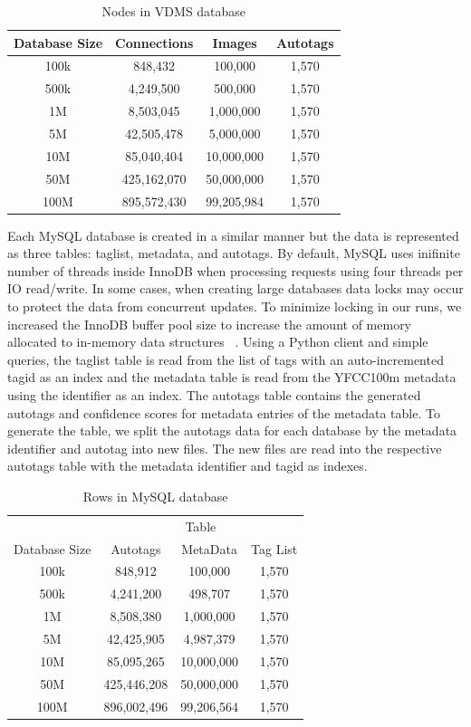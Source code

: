 \begin{table}[h]
\caption{Nodes in VDMS database}
\centering
\begin{tabular}{c c c c}
\hline\hline
Database Size & Connections & Images & Autotags\\
\hline
100k & 848,432      & 100,000     & 1,570\\
500k & 4,249,500    & 500,000     & 1,570\\
1M   & 8,503,045    & 1,000,000   & 1,570\\
5M   & 42,505,478   & 5,000,000   & 1,570\\
10M  & 85,040,404   & 10,000,000  & 1,570\\
50M  & 425,162,070  & 50,000,000  & 1,570\\
100M & 895,572,430  & 99,205,984  & 1,570\\
\hline
\end{tabular}
\label{table:vdmsnodes}
\end{table}

Each MySQL database is created in a similar manner but the data is represented as three tables: taglist, metadata, and autotags.  By default, MySQL uses inifinite number of threads inside InnoDB when processing requests using four threads per IO read/write.  In some cases, when creating large databases data locks may occur to protect the data from concurrent updates.  To minimize locking in our runs, we increased the InnoDB buffer pool size to increase the amount of memory allocated to in-memory data structures ~\cite{mysql,mysql_blog}. Using a Python client and simple queries, the taglist table is read from the list of tags with an auto-incremented tagid as an index and the metadata table is read from the YFCC100m metadata using the identifier as an index. The autotags table contains the generated autotags and confidence scores for metadata entries of the metadata table. To generate the table, we split the autotags data for each database by the metadata identifier and autotag into new files. The new files are read into the respective autotags table with the metadata identifier and tagid as indexes.

\begin{table}[h]
\caption{Rows in MySQL database}
\centering
\begin{tabular}{c c c c}
\hline\hline
 & \multicolumn{3}{c}{Table}\\
\cline{2-4}
Database Size & Autotags & MetaData & Tag List\\
\hline
100k & 848,912     & 100,000    & 1,570\\
500k & 4,241,200   & 498,707    & 1,570\\
1M   & 8,508,380   & 1,000,000  & 1,570\\
5M   & 42,425,905  & 4,987,379  & 1,570\\
10M  & 85,095,265  & 10,000,000 & 1,570\\
50M  & 425,446,208 & 50,000,000 & 1,570\\
100M & 896,002,496 & 99,206,564 & 1,570\\
\hline
\end{tabular}
\label{table:mysqltables}
\end{table}

